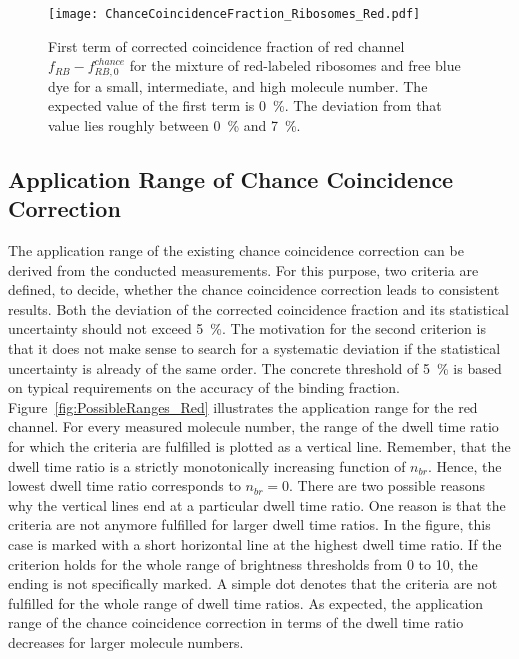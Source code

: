 \vfill
\begin{figure}[h!]
	\centering
	\texttt{[image: ChanceCoincidenceFraction\_Ribosomes\_Red.pdf]}
	\caption[First term of corrected coincidence fraction of red channel for mixture of red-labeled ribosomes and free blue dye]{First term of corrected coincidence fraction of red channel $f_{RB} - f_{RB,0}^{chance}$ for the mixture of red-labeled ribosomes and free blue dye for a small, intermediate, and high molecule number. The expected value of the first term is \SI{0}{\percent}. The deviation from that value lies roughly between \SI{0}{\percent} and \SI{7}{\percent}.}
	\label{fig:ChanceCoincidenceFraction_Ribosomes_Red}
\end{figure}
\vfill

\subsection{Application Range of Chance Coincidence Correction}

The application range of the existing chance coincidence correction can be derived from the conducted measurements. For this purpose, two criteria are defined, to decide, whether the chance coincidence correction leads to consistent results. Both the deviation of the corrected coincidence fraction and its statistical uncertainty should not exceed \SI{5}{\percent}. The motivation for the second criterion is that it does not make sense to search for a systematic deviation if the statistical uncertainty is already of the same order. The concrete threshold of \SI{5}{\percent} is based on typical requirements on the accuracy of the binding fraction. \\

Figure~\ref{fig:PossibleRanges_Red} illustrates the application range for the red channel. For every measured molecule number, the range of the dwell time ratio for which the criteria are fulfilled is plotted as a vertical line. Remember, that the dwell time ratio is a strictly monotonically increasing function of $n_{br}$. Hence, the lowest dwell time ratio corresponds to $n_{br} = 0$. There are two possible reasons why the vertical lines end at a particular dwell time ratio. One reason is that the criteria are not anymore fulfilled for larger dwell time ratios. In the figure, this case is marked with a short horizontal line at the highest dwell time ratio. If the criterion holds for the whole range of brightness thresholds from \num{0} to \num{10}, the ending is not specifically marked. A simple dot denotes that the criteria are not fulfilled for the whole range of dwell time ratios. As expected, the application range of the chance coincidence correction in terms of the dwell time ratio decreases for larger molecule numbers. \\

